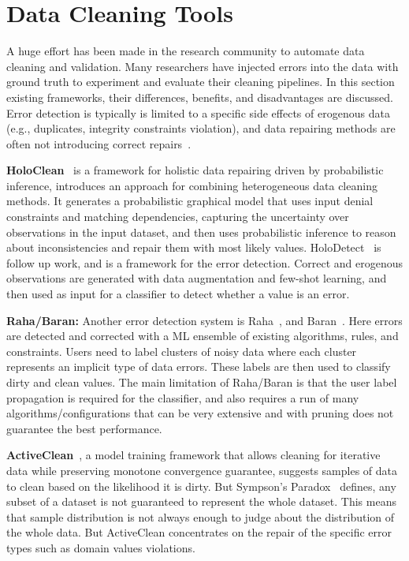 
\section{Data Cleaning Tools}
\label{sec:data_cleaning_tools}

A huge effort has been made in the research community to automate data cleaning and validation. 
Many researchers have injected errors into the data with ground truth to experiment and evaluate their cleaning pipelines.
In this section existing frameworks, their differences, benefits, and disadvantages are discussed.
Error detection is typically is limited to a specific side effects of erogenous data (e.g., duplicates, integrity constraints violation), and data repairing methods are often not introducing correct repairs~\cite{RekatsinasCIR2017}.

\textbf{HoloClean}~\cite{RekatsinasCIR2017} is a framework for holistic data repairing driven by probabilistic inference, introduces an approach for combining heterogeneous data cleaning methods.
It generates a probabilistic graphical model that uses input denial constraints and matching dependencies, capturing the uncertainty over observations in the input dataset, and then uses probabilistic inference to reason about inconsistencies and repair them with most likely values. 
HoloDetect~\cite{holodetect} is follow up work, and is a framework for the error detection.
Correct and erogenous observations are generated with data augmentation and few-shot learning, and then used as input for a classifier to detect whether a value is an error.

\textbf{Raha/Baran:}\cite{raha, baran}
Another error detection system is Raha~\cite{raha}, and Baran~\cite{baran}.
Here errors are detected and corrected with a ML ensemble of existing algorithms, rules, and constraints.
Users need to label clusters of noisy data where each cluster represents an implicit type of data errors.
These labels are then used to classify dirty and clean values. 
The main limitation of Raha/Baran is that the user label propagation is required for the classifier, and also requires a run of many algorithms/configurations that can be very extensive and with pruning does not guarantee the best performance.

\textbf{ActiveClean}~\cite{activeclean}, a model training framework that allows cleaning for iterative data while preserving monotone convergence guarantee, suggests samples of data to clean based on the likelihood it is dirty. 
But Sympson's Paradox~\cite{activeclean} defines, any subset of a dataset is not guaranteed to represent the whole dataset.
This means that sample distribution is not always enough to judge about the distribution of the whole data. 
But ActiveClean concentrates on the repair of the specific error types such as domain values violations.

